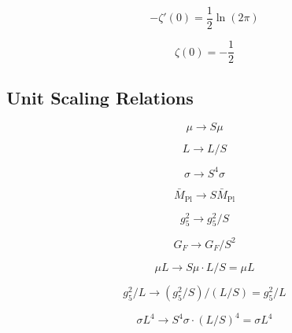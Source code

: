 \documentclass[11pt,a4paper]{article}
\theoremstyle{definition}
\begin{document}
\begin{equation}
\label{eq:th_ext_5}
-\zeta'(0) = \frac{1}{2}\ln(2\pi)
\end{equation}

\begin{equation}
\label{eq:th_ext_6}
\zeta(0) = -\frac{1}{2}
\end{equation}

\subsection{Unit Scaling Relations}
\label{subsec:unit_extended}

\begin{equation}
\label{eq:unit_ext_1}
\mu \to S\mu
\end{equation}

\begin{equation}
\label{eq:unit_ext_2}
L \to L/S
\end{equation}

\begin{equation}
\label{eq:unit_ext_3}
\sigma \to S^4\sigma
\end{equation}

\begin{equation}
\label{eq:unit_ext_4}
\bar{M}_{\text{Pl}} \to S\bar{M}_{\text{Pl}}
\end{equation}

\begin{equation}
\label{eq:unit_ext_5}
g_5^2 \to g_5^2/S
\end{equation}

\begin{equation}
\label{eq:unit_ext_6}
G_F \to G_F/S^2
\end{equation}

\begin{equation}
\label{eq:unit_ext_7}
\mu L \to S\mu \cdot L/S = \mu L
\end{equation}

\begin{equation}
\label{eq:unit_ext_8}
g_5^2/L \to (g_5^2/S)/(L/S) = g_5^2/L
\end{equation}

\begin{equation}
\label{eq:unit_ext_9}
\sigma L^4 \to S^4\sigma \cdot (L/S)^4 = \sigma L^4
\end{equation}
\end{document}

